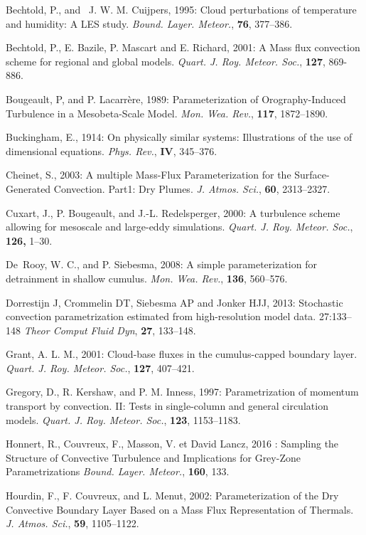 \noindent \por
Bechtold, P., and~ J. W. M. Cuijpers, 1995:
Cloud perturbations of temperature and humidity: A LES study.
{\it Bound. Layer. Meteor.}, {\bf 76}, 377--386.

\noindent \por
Bechtold, P., E. Bazile, P. Mascart and E. Richard, 2001:
A Mass flux convection scheme for regional and global models.
{\it Quart. J. Roy. Meteor. Soc.}, {\bf 127}, 869-886.

\noindent \por
Bougeault, P, and P. Lacarr\`ere, 1989: Parameterization of Orography-Induced
  Turbulence in a Mesobeta-Scale Model.
{\it Mon. Wea. Rev.}, {\bf 117}, 1872--1890.

\noindent \por
Buckingham, E., 1914: On physically similar systems: Illustrations of the use of
  dimensional equations.
{\it Phys. Rev.}, {\bf IV}, 345--376.

\noindent \por
Cheinet, S., 2003: A multiple Mass-Flux Parameterization for the
  Surface-Generated Convection. Part1: Dry Plumes.
{\it J. Atmos. Sci.}, {\bf 60}, 2313--2327.

\noindent \por
Cuxart, J., P. Bougeault, and J.-L. Redelsperger, 2000:
A turbulence scheme allowing for mesoscale and large-eddy simulations.
{\it Quart. J. Roy. Meteor. Soc.}, {\bf 126,} 1--30.

\noindent \por
De~Rooy, W. C., and P. Siebesma, 2008:
 A simple parameterization for detrainment in shallow cumulus.
{\it Mon. Wea. Rev.}, {\bf 136}, 560--576.

\noindent \por
Dorrestijn J, Crommelin DT, Siebesma AP and Jonker HJJ, 2013:
Stochastic convection parametrization estimated from high-resolution model data.  27:133--148
{\it Theor Comput Fluid Dyn}, {\bf 27}, 133--148.

\noindent \por
Grant, A. L. M., 2001: Cloud-base fluxes in the cumulus-capped boundary layer.
{\it Quart. J. Roy. Meteor. Soc.}, {\bf 127}, 407--421.

\noindent \por
Gregory, D., R. Kershaw, and P. M. Inness, 1997:
 Parametrization of momentum transport by
  convection. II: Tests in single-column and general circulation models.
{\it Quart. J. Roy. Meteor. Soc.}, {\bf 123}, 1153--1183.

\noindent \por
Honnert, R., Couvreux, F., Masson, V. et David Lancz, 2016 :
Sampling the Structure of Convective Turbulence and Implications for Grey-Zone Parametrizations
{\it Bound. Layer. Meteor.}, {\bf 160}, 133.

\noindent \por
Hourdin, F., F. Couvreux, and L. Menut, 2002:
 Parameterization of the Dry Convective
  Boundary Layer Based on a Mass Flux Representation of Thermals.
{\it J. Atmos. Sci.}, {\bf 59}, 1105--1122.

